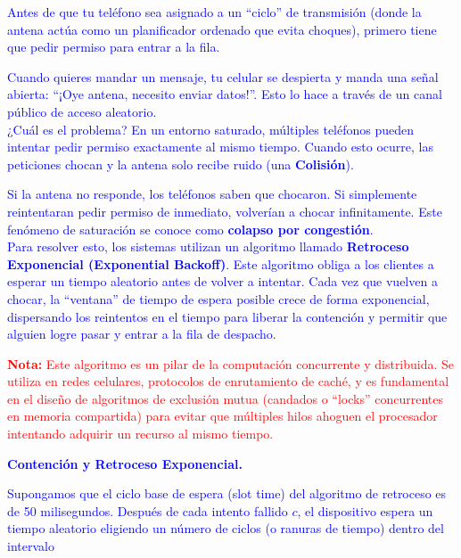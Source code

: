 {    \textcolor{blue}{Antes de que tu teléfono sea asignado a un ``ciclo'' de transmisión
    (donde la antena actúa como un planificador ordenado que evita
    choques), primero tiene que pedir permiso para entrar a la fila.}

    \textcolor{blue}{Cuando quieres mandar un mensaje, tu celular se despierta y manda una
    señal abierta: ``¡Oye antena, necesito enviar datos!''. Esto lo hace
    a través de un canal público de acceso aleatorio.}\\

    \textcolor{blue}{¿Cuál es el problema? En un entorno saturado, múltiples teléfonos
    pueden intentar pedir permiso exactamente al mismo tiempo. Cuando
    esto ocurre, las peticiones chocan y la antena solo recibe ruido
    (una \textbf{Colisión}).}

    \textcolor{blue}{Si la antena no responde, los teléfonos saben que chocaron. Si
    simplemente reintentaran pedir permiso de inmediato, volverían a
    chocar infinitamente. Este fenómeno de saturación se conoce como
    \textbf{colapso por congestión}.}\\

    \textcolor{blue}{Para resolver esto, los sistemas utilizan un algoritmo llamado
    \textbf{Retroceso Exponencial (Exponential Backoff)}. Este algoritmo
    obliga a los clientes a esperar un tiempo aleatorio antes de volver
    a intentar. Cada vez que vuelven a chocar, la ``ventana'' de tiempo
    de espera posible crece de forma exponencial, dispersando los
    reintentos en el tiempo para liberar la contención y permitir que
    alguien logre pasar y entrar a la fila de despacho.}

    \vspace{0.2cm}

    \noindent
    \textcolor{red}{\textbf{Nota:} Este algoritmo es un pilar de la computación concurrente
    y distribuida. Se utiliza en redes celulares, protocolos de
    enrutamiento de caché, y es fundamental en el diseño de algoritmos
    de exclusión mutua (candados o ``locks'' concurrentes en memoria
    compartida) para evitar que múltiples hilos ahoguen el procesador
    intentando adquirir un recurso al mismo tiempo.}

    \vspace{0.3cm}

    \textcolor{blue}{\textbf{Contención y Retroceso Exponencial.}}

    \textcolor{blue}{Supongamos que el ciclo base de espera (slot time) del algoritmo de
    retroceso es de 50 milisegundos. Después de cada intento fallido $c$,
    el dispositivo espera un tiempo aleatorio eligiendo un número de
    ciclos (o ranuras de tiempo) dentro del intervalo}

}
